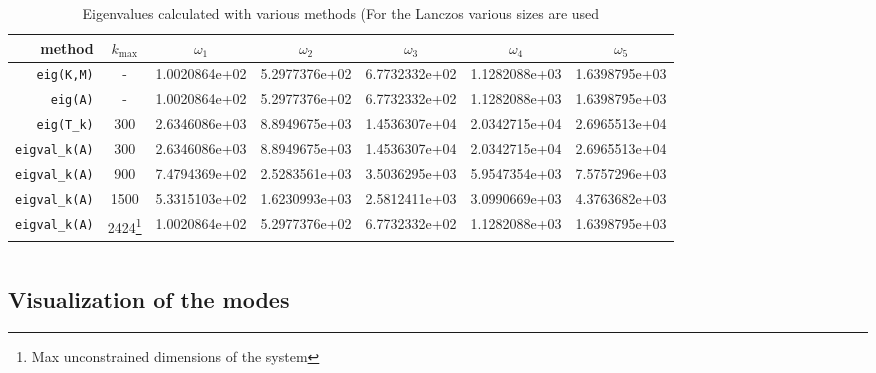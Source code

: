 \documentclass{article}
\newenvironment{code}{\captionsetup{type=listing}}{}
\begin{document}
\begin{table}[h!]
	\centering
	\caption{Eigenvalues calculated with various methods (For the Lanczos various sizes are used}\label{table:eig-calc-300}
	\begin{tabular}{r|c|c|c|c|c|c}
		method & $k_{\mathrm{max}}$ & $\omega_1$& $\omega_2$& $\omega_3$& $\omega_4$& $\omega_5$ \\\hline\hline
		\texttt{eig(K,M)} &-&  1.0020864e+02 & 5.2977376e+02 & 6.7732332e+02 & 1.1282088e+03 & 1.6398795e+03\\\hline
		\texttt{eig(A)} &-& 1.0020864e+02 & 5.2977376e+02 & 6.7732332e+02 & 1.1282088e+03 & 1.6398795e+03\\\hline\hline
		\texttt{eig(T\_k)} &300& 2.6346086e+03 & 8.8949675e+03 & 1.4536307e+04 & 2.0342715e+04 & 2.6965513e+04 \\\hline
		\texttt{eigval\_k(A)} &300& 2.6346086e+03 & 8.8949675e+03 & 1.4536307e+04 & 2.0342715e+04 & 2.6965513e+04\\\hline\hline
		\texttt{eigval\_k(A)} &900& 7.4794369e+02 & 2.5283561e+03 & 3.5036295e+03 & 5.9547354e+03 & 7.5757296e+03\\\hline\hline
		\texttt{eigval\_k(A)} &1500& 5.3315103e+02 & 1.6230993e+03 & 2.5812411e+03 & 3.0990669e+03 & 4.3763682e+03\\\hline\hline
		\texttt{eigval\_k(A)} &2424\footnote{Max unconstrained dimensions of the system}& 1.0020864e+02 & 5.2977376e+02 & 6.7732332e+02 & 1.1282088e+03 & 1.6398795e+03\\\hline\hline
	\end{tabular}
	 
	 
	
	
\end{table}
 
\FloatBarrier

\begin{code}
	\inputminted[mathescape,linenos,frame=lines,firstline=7,lastline=30]{matlab}{../tests/solve_afm.m}
	\label{code:solve-afm}
\end{code}
	
\subsection{Visualization of the modes}
\end{document}
